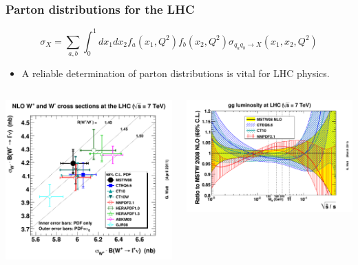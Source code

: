 \documentclass[10pt]{beamer}
\newcommand{\be}{\begin{equation*}}
\newcommand{\ee}{\end{equation*}}
\begin{document}
\begin{frame}
\frametitle{Parton distributions for the LHC}
\be \sigma_X= \sum_{a,b} \int_0^1 dx_1dx_2 f_a(x_1,Q^2)f_b(x_2,Q^2)\sigma_{q_aq_b \to X} \left( x_1,x_2,Q^2 \right) \ee
\begin{itemize}
		\item<1-> A reliable determination of parton distributions is vital for LHC physics.
\end{itemize}

\begin{columns}
  \begin{column}{0.45\textwidth}
      \includegraphics[width=1.0\textwidth]{w+w-lhc7nlo68err.eps}
  \end{column}
  
    \begin{column}{0.55\textwidth}
      \includegraphics[width=1.0\textwidth]{ratiogglumi1_68cl.eps}\\
      \\


\end{column}
\end{columns}
\end{frame}
\end{document}
